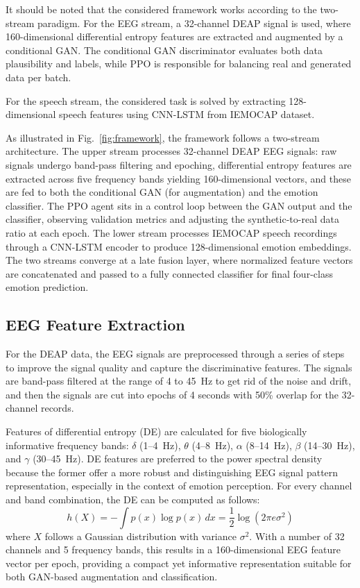 \documentclass[conference]{IEEEtran}
\begin{document}
It should be noted that the considered framework works according to the two-stream paradigm. For the EEG stream, a 32-channel DEAP signal is used, where 160-dimensional differential entropy features are extracted and augmented by a conditional GAN. The conditional GAN discriminator evaluates both data plausibility and labels, while PPO is responsible for balancing real and generated data per batch.

For the speech stream, the considered task is solved by extracting 128-dimensional speech features using CNN-LSTM from IEMOCAP dataset.

As illustrated in Fig.~\ref{fig:framework}, the framework follows a two-stream architecture. The upper stream processes 32-channel DEAP EEG signals: raw signals undergo band-pass filtering and epoching, differential entropy features are extracted across five frequency bands yielding 160-dimensional vectors, and these are fed to both the conditional GAN (for augmentation) and the emotion classifier. The PPO agent sits in a control loop between the GAN output and the classifier, observing validation metrics and adjusting the synthetic-to-real data ratio at each epoch. The lower stream processes IEMOCAP speech recordings through a CNN-LSTM encoder to produce 128-dimensional emotion embeddings. The two streams converge at a late fusion layer, where normalized feature vectors are concatenated and passed to a fully connected classifier for final four-class emotion prediction.

\subsection{EEG Feature Extraction}

For the DEAP data, the EEG signals are preprocessed through a series of steps to improve the signal quality and capture the discriminative features. The signals are band-pass filtered at the range of 4 to 45~Hz to get rid of the noise and drift, and then the signals are cut into epochs of 4 seconds with 50\% overlap for the 32-channel records.

Features of differential entropy (DE) are calculated for five biologically informative frequency bands:
$\delta$ (1--4~Hz), $\theta$ (4--8~Hz), $\alpha$ (8--14~Hz), $\beta$ (14--30~Hz), and $\gamma$ (30--45~Hz). DE features are preferred to the power spectral density because the former offer a more robust and distinguishing EEG signal pattern representation, especially in the context of emotion perception. For every channel and band combination, the DE can be computed as follows:
\begin{equation}
\label{eq:de}
h(X) = -\int p(x) \log p(x)\, dx = \frac{1}{2} \log(2\pi e \sigma^2)
\end{equation}
where $X$ follows a Gaussian distribution with variance $\sigma^2$. With a number of 32 channels and 5 frequency bands, this results in a 160-dimensional EEG feature vector per epoch, providing a compact yet informative representation suitable for both GAN-based augmentation and classification.
\end{document}
